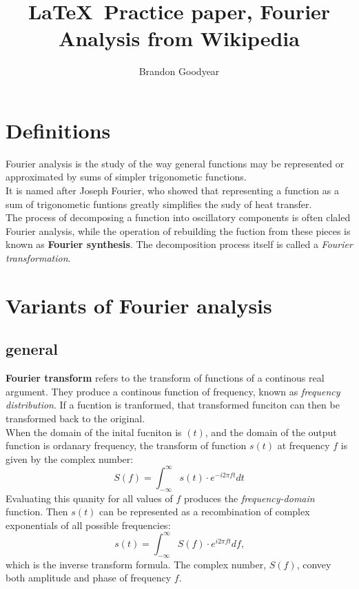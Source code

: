 \documentclass{article}
\begin{document}
\title{\LaTeX \ Practice paper, Fourier Analysis from Wikipedia}
\author{Brandon Goodyear}
\maketitle
\tableofcontents

\section{Definitions}
Fourier analysis is the study of the way general functions may be represented or approximated by sums of simpler trigonometic functions. \\
It is named after Joseph Fourier, who showed that representing a function as a sum of trigonometic funtions greatly simplifies the sudy of heat transfer. \\
The process of decomposing a function into oscillatory components is often claled Fourier analysis, while the operation of rebuilding the fuction from these pieces is known as \textbf{Fourier synthesis}.
The decomposition process itself is called a \textit{Fourier transformation}.

\section{Variants of Fourier analysis}
\subsection{general}
\textbf{Fourier transform} refers to the transform of functions of a continous real argument. They produce a continous function of frequency, known as \textit{frequency distribution}. If a fucntion is tranformed, that transformed funciton can then be transformed back to the original. \\
When the domain of the inital fucniton is $(t)$, and the domain of the output function is ordanary frequency, the transform of function $s(t)$ at frequency $f$ is given by the complex number:
\begin{equation*}
S(f)=\int_{-\infty}^{\infty}{s(t) \cdot e^{-i2\pi ft}}dt
\end{equation*}
Evaluating this quanity for all values of $f$ produces the \textit{frequency-domain} function. Then $s(t)$ can be represented as a recombination of complex exponentials of all possible frequencies:
\begin{equation*}
s(t)=\int_{-\infty}^{\infty}{S(f) \cdot e^{i2\pi ft}}df \text{,}
\end{equation*}
which is the inverse transform formula. The complex number, $S(f)$, convey both amplitude and phase of frequency $f$.
\end{document}
